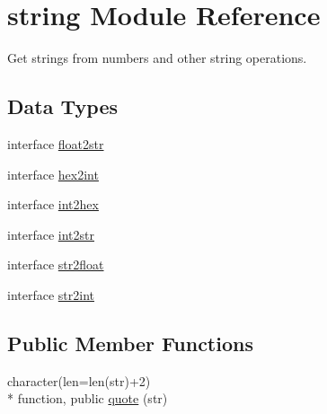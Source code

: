 \hypertarget{classstring}{\section{string Module Reference}
\label{classstring}
}


Get strings from numbers and other string operations.  


\subsection*{Data Types}
\begin{DoxyCompactItemize}
\item 
interface \hyperlink{interfacestring_1_1float2str}{float2str}
\item 
interface \hyperlink{interfacestring_1_1hex2int}{hex2int}
\item 
interface \hyperlink{interfacestring_1_1int2hex}{int2hex}
\item 
interface \hyperlink{interfacestring_1_1int2str}{int2str}
\item 
interface \hyperlink{interfacestring_1_1str2float}{str2float}
\item 
interface \hyperlink{interfacestring_1_1str2int}{str2int}
\end{DoxyCompactItemize}
\subsection*{Public Member Functions}
\begin{DoxyCompactItemize}
\item 
character(len=len(str)+2) \\*
function, public \hyperlink{classstring_a43ac41bc9fa839e5e40ec725c029b5a4}{quote} (str)
\end{DoxyCompactItemize}

